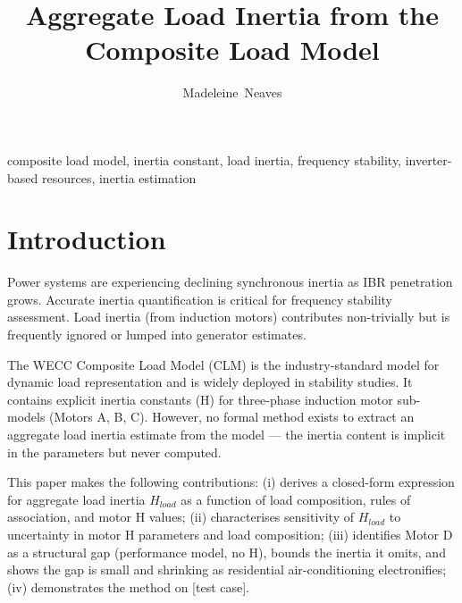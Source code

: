 \documentclass[journal]{IEEEtran}
\title{Aggregate Load Inertia from the Composite Load Model}
\author{Madeleine~Neaves}
\begin{document}
\maketitle

\begin{abstract}
\end{abstract}

\begin{IEEEkeywords}
composite load model, inertia constant, load inertia, frequency stability,
inverter-based resources, inertia estimation
\end{IEEEkeywords}

\section{Introduction}
\label{sec:intro}
Power systems are experiencing declining synchronous inertia as IBR penetration
grows. Accurate inertia quantification is critical for frequency stability
assessment. Load inertia (from induction motors) contributes non-trivially but
is frequently ignored or lumped into generator estimates.

The WECC Composite Load Model (CLM) is the industry-standard model for dynamic
load representation and is widely deployed in stability studies. It contains
explicit inertia constants (H) for three-phase induction motor sub-models
(Motors A, B, C). However, no formal method exists to extract an aggregate load
inertia estimate from the model — the inertia content is implicit in the
parameters but never computed.

This paper makes the following contributions:
(i)   derives a closed-form expression for aggregate load inertia \(H_{load}\) as a
      function of load composition, rules of association, and motor H values;
(ii)  characterises sensitivity of \(H_{load}\) to uncertainty in motor H parameters
      and load composition;
(iii) identifies Motor D as a structural gap (performance model, no H), bounds the
      inertia it omits, and shows the gap is small and shrinking as residential
      air-conditioning electronifies;
(iv)  demonstrates the method on [test case].
\end{document}
